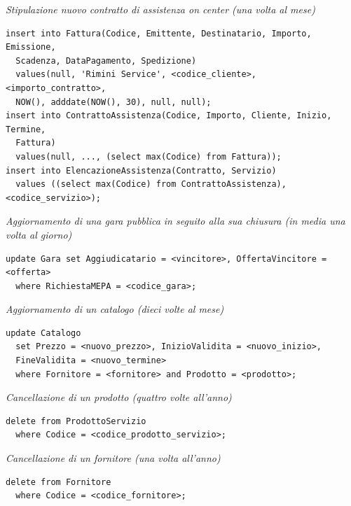 \noindent\textit{Stipulazione nuovo contratto di assistenza on center (una volta al mese)}
\begin{verbatim}
insert into Fattura(Codice, Emittente, Destinatario, Importo, Emissione,
  Scadenza, DataPagamento, Spedizione)
  values(null, 'Rimini Service', <codice_cliente>, <importo_contratto>,
  NOW(), adddate(NOW(), 30), null, null);
insert into ContrattoAssistenza(Codice, Importo, Cliente, Inizio, Termine,
  Fattura)
  values(null, ..., (select max(Codice) from Fattura));
insert into ElencazioneAssistenza(Contratto, Servizio)
  values ((select max(Codice) from ContrattoAssistenza), <codice_servizio>);
\end{verbatim}
\vspace{1cm}

\noindent\textit{Aggiornamento di una gara pubblica in seguito alla sua chiusura (in media una volta al giorno)}
\begin{verbatim}
update Gara set Aggiudicatario = <vincitore>, OffertaVincitore = <offerta>
  where RichiestaMEPA = <codice_gara>;
\end{verbatim}
\vspace{1cm}

\noindent\textit{Aggiornamento di un catalogo (dieci volte al mese)}
\begin{verbatim}
update Catalogo
  set Prezzo = <nuovo_prezzo>, InizioValidita = <nuovo_inizio>,
  FineValidita = <nuovo_termine>
  where Fornitore = <fornitore> and Prodotto = <prodotto>;
\end{verbatim}
\vspace{1cm}

\noindent\textit{Cancellazione di un prodotto (quattro volte all'anno)}
\begin{verbatim}
delete from ProdottoServizio
  where Codice = <codice_prodotto_servizio>;
\end{verbatim}
\vspace{1cm}

\noindent\textit{Cancellazione di un fornitore (una volta all'anno)}
\begin{verbatim}
delete from Fornitore
  where Codice = <codice_fornitore>;
\end{verbatim}
\vspace{1cm}

